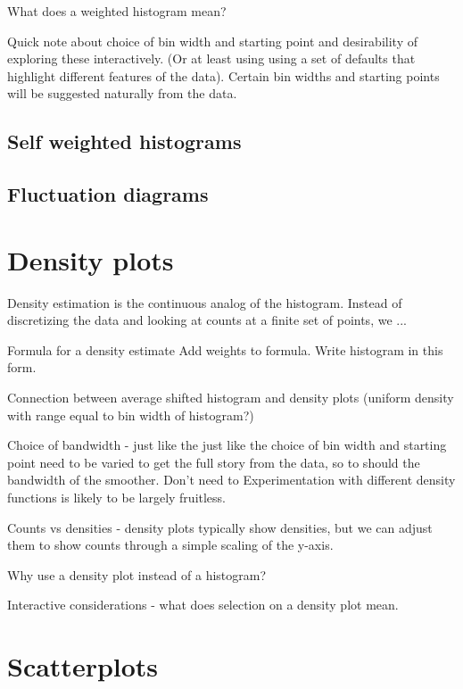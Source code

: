 \documentclass[oneside,letterpaper]{scrartcl}
\begin{document}
What does a weighted histogram mean? 

Quick note about choice of bin width and starting point and desirability of exploring these interactively.  (Or at least using using a set of defaults that highlight different features of the data).  Certain bin widths and starting points will be suggested naturally from the data.

\subsection{Self weighted histograms}\label{sub:self_weighted_histograms} %


\subsection{Fluctuation diagrams}\label{sub:fluctuation_diagrams}


\section{Density plots}\label{sec:density_estimation}

Density estimation is the continuous analog of the histogram.  Instead of discretizing the data and looking at counts at a finite set of points, we ...

Formula for a density estimate
Add weights to formula.
Write histogram in this form.

Connection between average shifted histogram and density plots (uniform density with range equal to bin width of histogram?)

Choice of bandwidth - just like the just like the choice of bin width and starting point need to be varied to get the full story from the data, so to should the bandwidth of the smoother.  Don't  need to  Experimentation with different density functions is likely to be largely fruitless.

Counts vs densities - density plots typically show densities, but we can adjust them to show counts through a simple scaling of the y-axis.  

Why use a density plot instead of a histogram?

Interactive considerations - what does selection on a density plot mean.

\section{Scatterplots}\label{sec:scatterplots}
 
\end{document}

